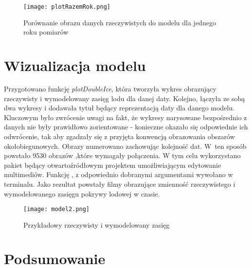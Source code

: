 \documentclass[letterpaper,12pt]{article}
\begin{document}
\begin{figure}[h!]
        \centering \texttt{[image: plotRazemRok.png]}
        \caption{
                \label{fig:samplesetup}
                Porównanie obrazu danych rzeczywistych do modelu dla jednego roku pomiarów
        }
\end{figure}




\newpage
\section{Wizualizacja modelu}

Przygotowano funkcję \textit{plotDoubleIce}, która tworzyła wykres obrazujący rzeczywisty i wymodelowany zasięg lodu dla danej daty. Kolejno, łączyła ze sobą dwa wykresy i dodawała tytuł będący reprezentacją daty dla danego modelu. Kluczowym było zwrócenie uwagi na fakt, że wykresy narysowane bezpośrednio z danych nie były prawidłowo zorientowane - konieczne okazało się odpowiednie ich odwrócenie, tak aby zgadzały się z przyjęta konwencją obrazowania obszarów okołobiegunowych. Obrazy numerowano zachowując kolejność dat. W~ten sposób powstało 9530 obrazów ,które wymagały połączenia. W tym celu wykorzystano pakiet  będący otwartoźródłowym projektem umożliwiającym edytowanie multimediów. Funkcję , z odpowiednio dobranymi argumentami wywołano w terminalu. Jako rezultat powstały filmy obrazujące zmienność rzeczywistego i wymodelowanego zasięgu pokrywy lodowej w czasie.

\begin{figure}[ht]
        \centering \texttt{[image: model2.png]}
        \caption{
                \label{fig:samplesetup}
                Przykładowy rzeczywisty i wymodelowany zasięg
        }
\end{figure}


\section{Podsumowanie}

\end{document}
